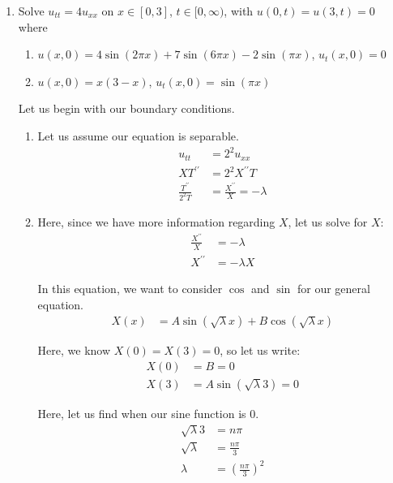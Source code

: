 \documentclass{article}
\begin{document}
\begin{enumerate}
\newpage

%
%

  \item Solve $u_{tt} = 4u_{xx}$ on $x \in [0, 3]$, $t \in [0, \infty)$, with $u(0, t) = u(3, t) = 0$ where

  \begin{enumerate}
    \item $u(x, 0) = 4 \sin(2 \pi x) + 7 \sin(6 \pi x) - 2\sin(\pi x)$, $u_t(x, 0) = 0$
    \item $u(x, 0) = x(3 - x)$, $u_t(x, 0) = \sin(\pi x)$
  \end{enumerate}

  Let us begin with our boundary conditions.
  \begin{enumerate}
    \item Let us assume our equation is separable.
    \begin{align}
      u_{tt} & = 2^2 u_{xx}\\
      XT^{\prime\prime} & = 2^2 X^{\prime\prime}T\\
      \frac{T^{\prime\prime}}{2^2 T} & = \frac{X^{\prime\prime}}{X} = - \lambda
    \end{align}

    \item Here, since we have more information regarding $X$, let us solve for $X$:
    \begin{align}
      \frac{X^{\prime\prime}}{X} & = - \lambda\\
      X^{\prime\prime} & = - \lambda X
    \end{align}

    In this equation, we want to consider $\cos$ and $\sin$ for our general equation.
    \begin{align}
      X(x) & = A \sin(\sqrt \lambda x) + B \cos (\sqrt \lambda x)
    \end{align}

    Here, we know $X(0) = X(3) = 0$, so let us write:
    \begin{align}
      X(0) & = B = 0\\
      X(3) & = A \sin(\sqrt \lambda 3) = 0
    \end{align}

     Here, let us find when our sine function is $0$.
     \begin{align}
       \sqrt \lambda 3 & = n \pi\\
       \sqrt \lambda & = \frac{n \pi}{3}\\
       \lambda & = \left( \frac{n \pi}{3} \right)^2
     \end{align}


\end{enumerate}
\end{enumerate}
\end{document}
